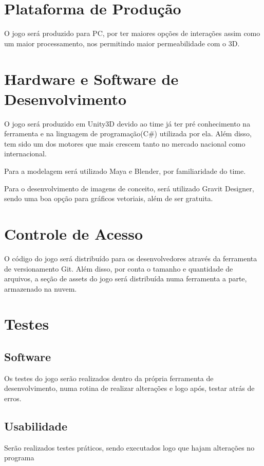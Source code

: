 
\section{Plataforma de Produção}

O jogo será produzido para PC, por ter maiores opções de interações assim como um maior processamento, nos permitindo maior permeabilidade com o 3D.


\section{Hardware e Software de Desenvolvimento}

O jogo será produzido em Unity3D devido ao time já ter pré conhecimento na ferramenta e na linguagem de programação(C\#) utilizada por ela. Além disso, tem sido um dos motores que mais crescem tanto no mercado nacional como internacional.

Para a modelagem será utilizado Maya e Blender, por familiaridade do time.

Para o desenvolvimento de imagens de conceito, será utilizado Gravit Designer, sendo uma boa opção para gráficos vetoriais, além de ser gratuita.

\section{Controle de Acesso}

O código do jogo será distribuído para os desenvolvedores através da ferramenta de versionamento Git. Além disso, por conta o tamanho e quantidade de arquivos, a seção de assets do jogo será distribuída numa ferramenta a parte, armazenado na nuvem.

\section{Testes}
\subsection{Software}

Os testes do jogo serão realizados dentro da própria ferramenta de desenvolvimento, numa rotina de realizar alterações e logo após, testar atrás de erros.

\subsection{Usabilidade}

Serão realizados testes práticos, sendo executados logo que hajam alterações no programa



